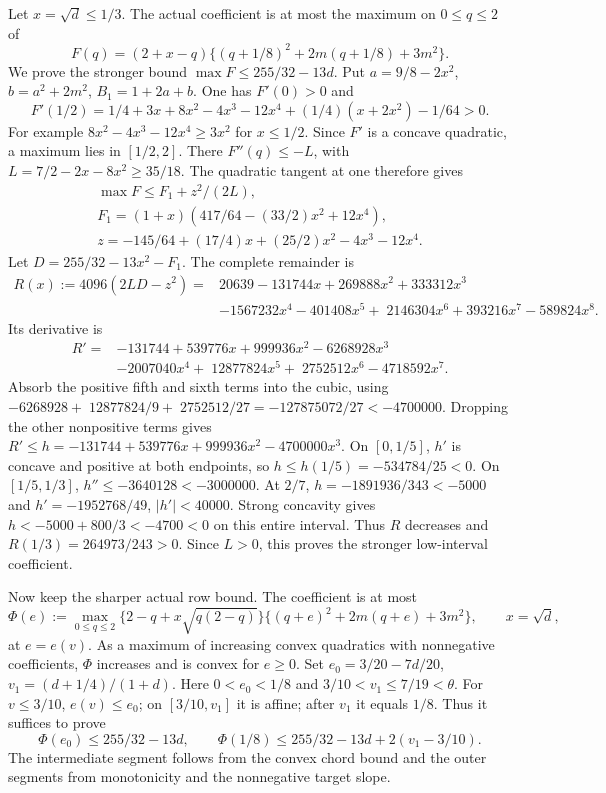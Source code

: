 Let $x=\sqrt d\le1/3$. The actual coefficient is at most the maximum on
$0\le q\le2$ of
\[
F(q)=(2+x-q)\{(q+1/8)^2+2m(q+1/8)+3m^2\}.
\]
We prove the stronger bound $\max F\le255/32-13d$.
Put $a=9/8-2x^2$, $b=a^2+2m^2$, $B_1=1+2a+b$.
One has $F'(0)>0$ and
\[
F'(1/2)=1/4+3x+8x^2-4x^3-12x^4+(1/4)(x+2x^2)-1/64>0.
\]
For example $8x^2-4x^3-12x^4\ge3x^2$ for $x\le1/2$.
Since $F'$ is a concave quadratic, a maximum lies in $[1/2,2]$.
There $F''(q)\le-L$, with $L=7/2-2x-8x^2\ge35/18$.
The quadratic tangent at one therefore gives
\[
\begin{gathered}
\max F\le F_1+z^2/(2L),\\
F_1=(1+x)(417/64-(33/2)x^2+12x^4),\\
z=-145/64+(17/4)x+(25/2)x^2-4x^3-12x^4.
\end{gathered}
\]
 Let $D=255/32-13x^2-F_1$. The complete remainder is
\[
\begin{aligned}
R(x):=4096(2LD-z^2)={}&20639-131744x+269888x^2+333312x^3\\
&-1567232x^4-401408x^5+\;2146304x^6
+393216x^7-589824x^8.
\end{aligned}
\]
Its derivative is
\[
\begin{aligned}
R'={}&-131744+539776x+999936x^2-6268928x^3\\
&-2007040x^4+\;12877824x^5+\;2752512x^6-4718592x^7.
\end{aligned}
\]
Absorb the positive fifth and sixth terms into the cubic, using
$-6268928+\;12877824/9+\;2752512/27=-127875072/27<-4700000$.
Dropping the other nonpositive terms gives
$R'\le h=-131744+539776x+999936x^2-4700000x^3$.
On $[0,1/5]$, $h'$ is concave and positive at both endpoints, so
$h\le h(1/5)=-534784/25<0$.
On $[1/5,1/3]$, $h''\le-3640128<-3000000$.
At $2/7$, $h=-1891936/343<-5000$ and
$h'=-1952768/49$, $|h'|<40000$.
Strong concavity gives
$h<-5000+800/3<-4700<0$ on this entire interval.
Thus $R$ decreases and $R(1/3)=264973/243>0$.
Since $L>0$, this proves the stronger low-interval coefficient.

Now keep the sharper actual row bound. The coefficient is at most
\[
\Phi(e):=\max_{0\le q\le2}
\{2-q+x\sqrt{q(2-q)}\}\{(q+e)^2+2m(q+e)+3m^2\},
\qquad x=\sqrt d,
\]
at $e=e(v)$. As a maximum of increasing convex quadratics with
nonnegative coefficients, $\Phi$ increases and is convex for $e\ge0$.
Set $e_0=3/20-7d/20$, $v_1=(d+1/4)/(1+d)$.
Here $0<e_0<1/8$ and $3/10<v_1\le7/19<\theta$.
For $v\le3/10$, $e(v)\le e_0$; on $[3/10,v_1]$ it is affine;
after $v_1$ it equals $1/8$. Thus it suffices to prove
\[
\Phi(e_0)\le255/32-13d,\qquad
\Phi(1/8)\le255/32-13d+2(v_1-3/10).
\]
The intermediate segment follows from the convex chord bound and the
outer segments from monotonicity and the nonnegative target slope.


